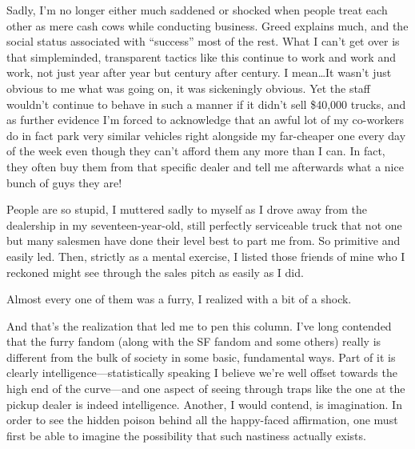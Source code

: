 Sadly, I'm no longer either much saddened or shocked when people treat each other as mere cash cows while conducting business. Greed explains much, and the social status associated with ``success'' most of the rest. What I can't get over is that simpleminded, transparent tactics like this continue to work and work and work, not just year after year but century after century. I mean\ldots  It wasn't just obvious to me what was going on, it was sickeningly obvious. Yet the staff wouldn't continue to behave in such a manner if it didn't sell \$40,000 trucks, and as further evidence I'm forced to acknowledge that an awful lot of my co-workers do in fact park very similar vehicles right alongside my far-cheaper one every day of the week even though they can't afford them any more than I can. In fact, they often buy them from that specific dealer and tell me afterwards what a nice bunch of guys they are!

People are so stupid, I muttered sadly to myself as I drove away from the dealership in my seventeen-year-old, still perfectly serviceable truck that not one but many salesmen have done their level best to part me from. So primitive and easily led. Then, strictly as a mental exercise, I listed those friends of mine who I reckoned might see through the sales pitch as easily as I did.

Almost every one of them was a furry, I realized with a bit of a shock.

And that's the realization that led me to pen this column. I've long contended that the furry fandom (along with the SF fandom and some others) really is different from the bulk of society in some basic, fundamental ways. Part of it is clearly intelligence—statistically speaking I believe we're well offset towards the high end of the curve—and one aspect of seeing through traps like the one at the pickup dealer is indeed intelligence. Another, I would contend, is imagination. In order to see the hidden poison behind all the happy-faced affirmation, one must first be able to imagine the possibility that such nastiness actually exists.

